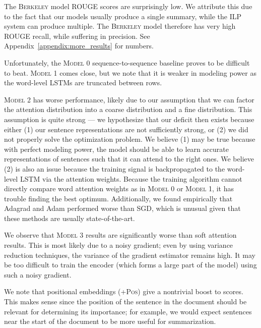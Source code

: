 \documentclass[12pt]{report}
\begin{document}
The \textsc{Berkeley} model ROUGE scores are surprisingly low. We attribute this due to the fact that our models usually produce a single summary, while the ILP system can produce multiple. The \textsc{Berkeley} model therefore has very high ROUGE recall, while suffering in precision. See Appendix~\ref{appendix:more_results} for numbers.

Unfortunately, the \textsc{Model 0} sequence-to-sequence baseline proves to be difficult to beat. \textsc{Model 1} comes close, but we note that it is weaker in modeling power as the word-level LSTMs are truncated between rows.

\textsc{Model 2} has worse performance, likely due to our assumption that we can factor the attention distribution into a coarse distribution and a fine distribution.
This assumption is quite strong --- we hypothesize that our deficit then exists because either (1) our sentence representations are not sufficiently strong, or (2) we did not properly solve the optimization problem.
We believe (1) may be true because with perfect modeling power, the model should be able to learn accurate representations of sentences such that it can attend to the right ones.
We believe (2) is also an issue because the training signal is backpropagated to the word-level LSTM via the attention weights. Because the training algorithm cannot directly compare word attention weights as in \textsc{Model 0} or \textsc{Model 1}, it has trouble finding the best optimum.
Additionally, we found empirically that Adagrad and Adam performed worse than SGD, which is unusual given that these methods are usually state-of-the-art.

We observe that \textsc{Model 3} results are significantly worse than soft attention results. This is most likely due to a noisy gradient; even by using variance reduction techniques, the variance of the gradient estimator remains high. It may be too difficult to train the encoder (which forms a large part of the model) using such a noisy gradient.

We note that positional embeddings (\textsc{+Pos}) give a nontrivial boost to scores. This makes sense since the position of the sentence in the document should be relevant for determining its importance; for example, we would expect sentences near the start of the document to be more useful for summarization.
\end{document}

